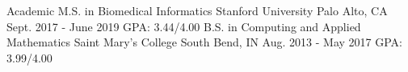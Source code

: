 \begin{cventries}
  \cventry
    {Academic M.S. in Biomedical Informatics}
    {Stanford University}
    {Palo Alto, CA}
    {Sept. 2017 - June 2019}
    {GPA: 3.44/4.00}
  \cventry
    {B.S. in Computing and Applied Mathematics}
    {Saint Mary's College}
    {South Bend, IN}
    {Aug. 2013 - May 2017}
    {GPA: 3.99/4.00}
\end{cventries}
